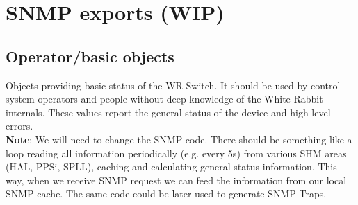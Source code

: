 \section{SNMP exports (WIP)}
\label{sec:snmp_exports}

\subsection{Operator/basic objects}
Objects providing basic status of the WR Switch. It should be used by control
system operators and people without deep knowledge of the White Rabbit
internals. These values report the general status of the device and high level
errors.\\

{\bf Note}: We will need to change the SNMP code. There should be something like
a loop reading all information periodically (e.g. every 5s) from various SHM
areas (HAL, PPSi, SPLL), caching and calculating general status information.
This way, when we receive SNMP request we can feed the information from our
local SNMP cache. The same code could be later used to generate SNMP Traps.\\

